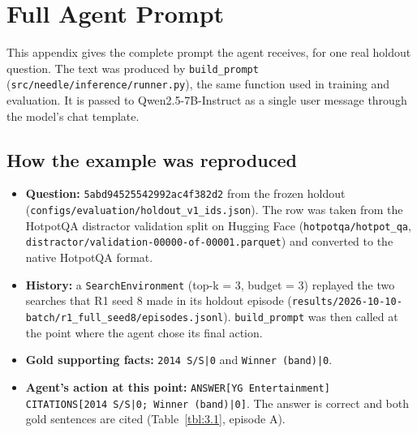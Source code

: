 \chapter{Full Agent Prompt}\label{sec:A}

This appendix gives the complete prompt the agent receives, for one real
holdout question. The text was produced by
\texttt{build\_\allowbreak{}prompt}
(\texttt{src/\allowbreak{}needle/\allowbreak{}inference/\allowbreak{}runner.\allowbreak{}py}),
the same function used in training and evaluation. It is passed to
Qwen2.5-7B-Instruct as a single user message through the model's chat
template.

\section{How the example was
reproduced}\label{how-the-example-was-reproduced}

\begin{itemize}
\tightlist
\item
  \textbf{Question:}
  \texttt{5abd\allowbreak{}9452\allowbreak{}5542\allowbreak{}992a\allowbreak{}c4f3\allowbreak{}82d2\allowbreak{}}
  from the frozen holdout
  (\texttt{configs/\allowbreak{}evaluation/\allowbreak{}holdout\_\allowbreak{}v1\_\allowbreak{}ids.\allowbreak{}json}).
  The row was taken from the HotpotQA distractor validation split on
  Hugging Face (\texttt{hotpotqa/\allowbreak{}hotpot\_\allowbreak{}qa},
  \texttt{distractor/\allowbreak{}validation-\allowbreak{}00000-\allowbreak{}of-\allowbreak{}00001.\allowbreak{}parquet})
  and converted to the native HotpotQA format.
\item
  \textbf{History:} a \texttt{SearchEnvironment} (top-k = 3, budget = 3)
  replayed the two searches that R1 seed 8 made in its holdout episode
  (\texttt{results/\allowbreak{}2026-\allowbreak{}10-\allowbreak{}10-\allowbreak{}batch/\allowbreak{}r1\_\allowbreak{}full\_\allowbreak{}seed8/\allowbreak{}episodes.\allowbreak{}jsonl}).
  \texttt{build\_\allowbreak{}prompt} was then called at the point where
  the agent chose its final action.
\item
  \textbf{Gold supporting facts:} \texttt{2014 S/\allowbreak{}S|0} and
  \texttt{Winner (band)|0}.
\item
  \textbf{Agent's action at this point:}
  \texttt{ANSWER{[}\allowbreak{}YG Entertainment{]} CITATIONS{[}\allowbreak{}2014 S/\allowbreak{}S|0; Winner (band)|0{]}}.
  The answer is correct and both gold sentences are cited
  (Table~\ref{tbl:3.1}, episode A).
\end{itemize}

